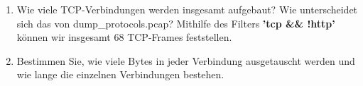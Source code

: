 \documentclass[11pt]{article}
\begin{document}
\begin{enumerate}[\thesection .1]
        $\diamond$ TCP checksum (2 Byte)
        \begin{addmargin}[1em]{1em}
            Die Prüfsumme des TCP-Headers dient der Erkennung von Fehlübertragungen, bestehend aus Empfänger-IP,
            Sender-IP, TCP-Protokollerkennung, Länge des TCP-Headers und Nutzdaten.

        \end{addmargin}

        \item Wie viele TCP-Verbindungen werden insgesamt aufgebaut? Wie unterscheidet sich das von dump\_protocols.pcap?
        Mithilfe des Filters \textbf{'tcp \&\& !http'} können wir insgesamt 68 TCP-Frames feststellen.
        \item Bestimmen Sie, wie viele Bytes in jeder Verbindung ausgetauscht werden und wie lange die einzelnen Verbindungen bestehen.
    \end{enumerate}
\end{document}
